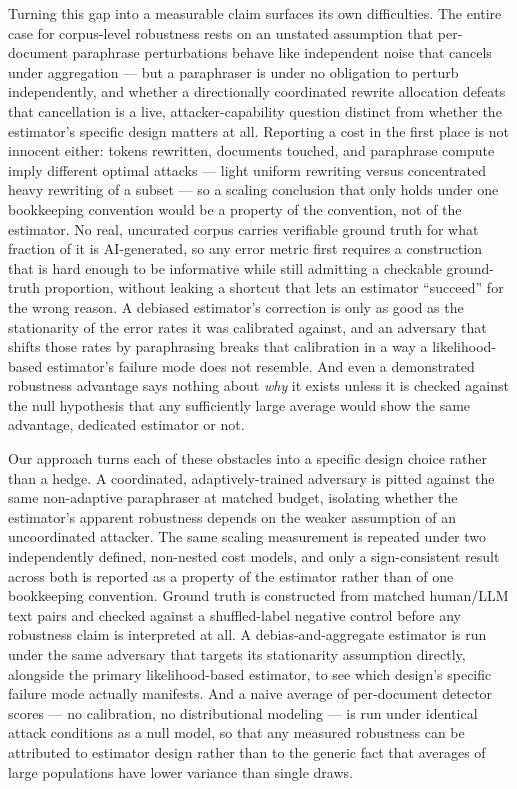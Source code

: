 \documentclass[11pt]{article}
\begin{document}
Turning this gap into a measurable claim surfaces its own difficulties. The entire case for corpus-level robustness rests on an unstated assumption that per-document paraphrase perturbations behave like independent noise that cancels under aggregation --- but a paraphraser is under no obligation to perturb independently, and whether a directionally coordinated rewrite allocation defeats that cancellation is a live, attacker-capability question distinct from whether the estimator's specific design matters at all. Reporting a cost in the first place is not innocent either: tokens rewritten, documents touched, and paraphrase compute imply different optimal attacks --- light uniform rewriting versus concentrated heavy rewriting of a subset --- so a scaling conclusion that only holds under one bookkeeping convention would be a property of the convention, not of the estimator. No real, uncurated corpus carries verifiable ground truth for what fraction of it is AI-generated, so any error metric first requires a construction that is hard enough to be informative while still admitting a checkable ground-truth proportion, without leaking a shortcut that lets an estimator ``succeed'' for the wrong reason. A debiased estimator's correction is only as good as the stationarity of the error rates it was calibrated against, and an adversary that shifts those rates by paraphrasing breaks that calibration in a way a likelihood-based estimator's failure mode does not resemble. And even a demonstrated robustness advantage says nothing about \emph{why} it exists unless it is checked against the null hypothesis that any sufficiently large average would show the same advantage, dedicated estimator or not.

Our approach turns each of these obstacles into a specific design choice rather than a hedge. A coordinated, adaptively-trained adversary is pitted against the same non-adaptive paraphraser at matched budget, isolating whether the estimator's apparent robustness depends on the weaker assumption of an uncoordinated attacker. The same scaling measurement is repeated under two independently defined, non-nested cost models, and only a sign-consistent result across both is reported as a property of the estimator rather than of one bookkeeping convention. Ground truth is constructed from matched human/LLM text pairs and checked against a shuffled-label negative control before any robustness claim is interpreted at all. A debias-and-aggregate estimator is run under the same adversary that targets its stationarity assumption directly, alongside the primary likelihood-based estimator, to see which design's specific failure mode actually manifests. And a naive average of per-document detector scores --- no calibration, no distributional modeling --- is run under identical attack conditions as a null model, so that any measured robustness can be attributed to estimator design rather than to the generic fact that averages of large populations have lower variance than single draws.
\end{document}
